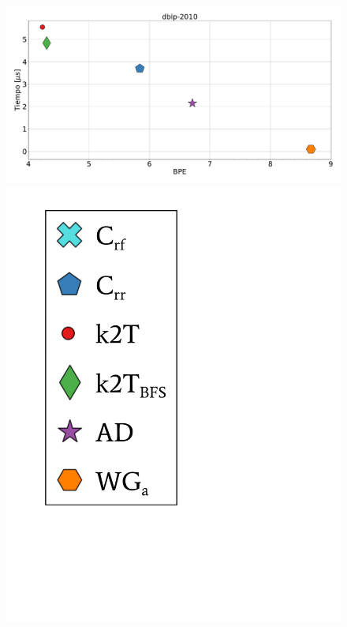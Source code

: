 \begin{figure}
    	\centering
    	\begin{minipage}{1\textwidth}
    			\centering
    			\begin{minipage}{0.8\textwidth}
    				\centering
    				\includegraphics[width=1\linewidth]{img/bpeTimes/aleatorio/dblp-2010.pdf}
    			\end{minipage}
    			\begin{minipage}{0.15\textwidth}
    				\centering
    				\includegraphics[scale=.24, clip, trim=70 200 300 40]{img/bpeTimes/labelAle.pdf}
    			\end{minipage}
    			

\end{minipage}
\end{figure}
